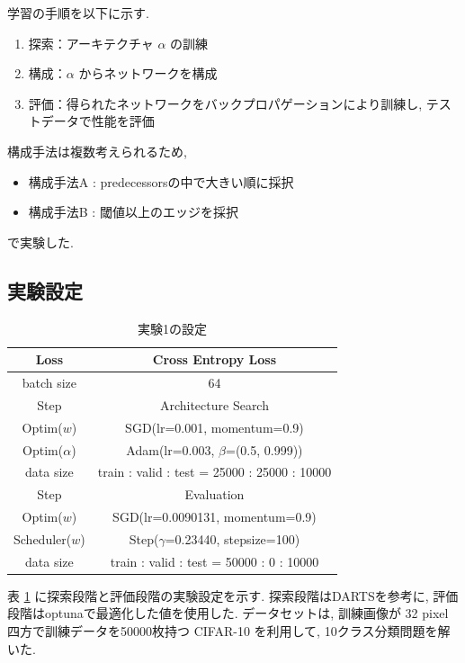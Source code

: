 \documentclass[twocolumn]{jarticle}     %
\begin{document}
学習の手順を以下に示す.
\begin{enumerate}
  \item 探索：アーキテクチャ $\alpha$ の訓練
  \item 構成：$\alpha$ からネットワークを構成
  \item 評価：得られたネットワークをバックプロパゲーションにより訓練し, テストデータで性能を評価
\end{enumerate}

構成手法は複数考えられるため,
\begin{itemize}
  \item 構成手法A : predecessorsの中で大きい順に採択
  \item 構成手法B : 閾値以上のエッジを採択
\end{itemize}
で実験した.

\subsection{実験設定}

\begin{table}[tb]
  \begin{center}
    \caption{実験1の設定}
    \begin{tabular}{|c|c|} \hline
      Loss & Cross Entropy Loss \\ \hline
      batch size & 64 \\ \hline\hline
      Step & Architecture Search \\ \hline
      Optim($w$) & SGD(lr=0.001, momentum=0.9) \\ \hline
      Optim($\alpha$) & Adam(lr=0.003, $\beta$=(0.5, 0.999)) \\ \hline
      data size & train : valid : test = 25000 : 25000 : 10000\\ \hline\hline
      Step & Evaluation \\ \hline
      Optim($w$) & SGD(lr=0.0090131, momentum=0.9) \\ \hline
      Scheduler($w$) & Step($\gamma$=0.23440, stepsize=100) \\ \hline
      data size & train : valid : test = 50000 : 0 : 10000\\ \hline
    \end{tabular}
    \label{tab:setting1}
  \end{center}
\end{table}

表 \ref{tab:setting1} に探索段階と評価段階の実験設定を示す.
探索段階はDARTSを参考に, 評価段階はoptunaで最適化した値を使用した.
データセットは, 訓練画像が 32 pixel 四方で訓練データを50000枚持つ CIFAR-10 を利用して,
10クラス分類問題を解いた.
\end{document}
